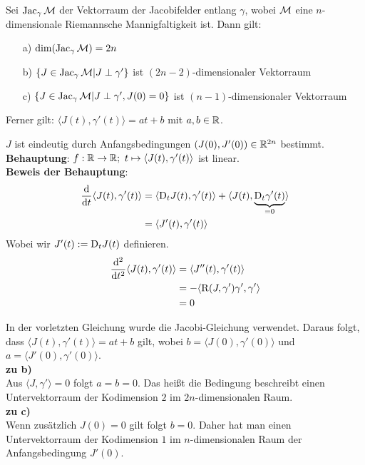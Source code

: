 
\begin{lem}

Sei $\operatorname{Jac}_\gamma \mathcal{M}$ der Vektorraum der Jacobifelder entlang $\gamma$, wobei 
$\mathcal{M}$ eine $n$-dimensionale Riemannsche Mannigfaltigkeit ist.
Dann gilt:
\begin{itemize}
\item[a)] $\dim (\operatorname{Jac}_\gamma \mathcal{M}) = 2n$
\item[b)] $\{ J \in \operatorname{Jac}_\gamma \mathcal{M} \vert J \perp \gamma' \}$ ist 
    $(2n-2)$-dimensionaler Vektorraum
\item[c)] $\{ J \in \operatorname{Jac}_\gamma \mathcal{M} \vert J \perp \gamma' , J(0)=0\}$ ist 
    $(n-1)$-dimensionaler Vektorraum
\end{itemize}
Ferner gilt: $\langle J(t) , \gamma'(t)\rangle = at + b$ mit $a,b \in \mathbb{R}$.
\end{lem}
\begin{bew}
$J$ ist eindeutig durch Anfangsbedingungen $(J(0),J'(0))\in\mathbb{R}^{2n}$ bestimmt.\\
\textbf{Behauptung}: $f: \mathbb{R}\to\mathbb{R}; \ t \mapsto \langle J(t) , \gamma'(t)\rangle$
ist linear.\\
\textbf{Beweis der Behauptung}:
\begin{align*}
\dv{t}\langle J(t), \gamma'(t)\rangle &= \langle \mathrm{D}_t J(t), \gamma'(t) \rangle 
+ \langle J(t),\underbrace{\mathrm{D}_t \gamma'(t)}_{=0}\rangle\\
&=  \langle J'(t) , \gamma'(t)\rangle
\end{align*}
Wobei wir $J'(t):=\mathrm{D}_t J(t)$ definieren.
\begin{align*}
\dv[2]{t} \langle J(t), \gamma'(t)\rangle &= \langle J''(t), \gamma'(t)\rangle \\
&= -\langle\operatorname{R}(J, \gamma')\gamma', \gamma'\rangle\\
&= 0
\end{align*}

In der vorletzten Gleichung wurde die Jacobi-Gleichung verwendet.
Daraus folgt, dass $\langle J(t), \gamma'(t) \rangle = at + b$ gilt,
wobei $b=\langle J(0), \gamma'(0) \rangle$ und $a = \langle J'(0), \gamma'(0)\rangle$.\\
\textbf{zu b)}\\
Aus $\langle J, \gamma' \rangle = 0 $ folgt $a = b = 0$.
Das heißt die Bedingung beschreibt einen Untervektorraum der Kodimension $2$ im $2n$-dimensionalen
Raum.\\
\textbf{zu c)}\\
Wenn zusätzlich $J(0)=0$ gilt folgt $b = 0$.
Daher hat man einen Untervektorraum der Kodimension $1$ im $n$-dimensionalen Raum
der Anfangsbedingung $J'(0)$.
\end{bew}


